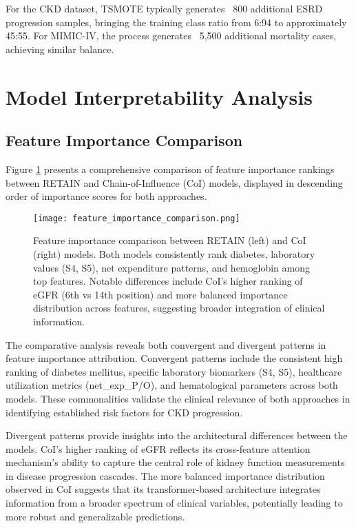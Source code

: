 \documentclass[letterpaper]{article}
\begin{document}
For the CKD dataset, TSMOTE typically generates ~800 additional ESRD progression samples, bringing the training class ratio from 6:94 to approximately 45:55. For MIMIC-IV, the process generates ~5,500 additional mortality cases, achieving similar balance.

\section{Model Interpretability Analysis}

\subsection{Feature Importance Comparison}

Figure \ref{fig:feature_comparison} presents a comprehensive comparison of feature importance rankings between RETAIN and Chain-of-Influence (CoI) models, displayed in descending order of importance scores for both approaches.

\begin{figure}[htbp]
\centering
\texttt{[image: feature\_importance\_comparison.png]}
\caption{Feature importance comparison between RETAIN (left) and CoI (right) models. Both models consistently rank diabetes, laboratory values (S4, S5), net expenditure patterns, and hemoglobin among top features. Notable differences include CoI's higher ranking of eGFR (6th vs 14th position) and more balanced importance distribution across features, suggesting broader integration of clinical information.}
\label{fig:feature_comparison}
\end{figure}

The comparative analysis reveals both convergent and divergent patterns in feature importance attribution. Convergent patterns include the consistent high ranking of diabetes mellitus, specific laboratory biomarkers (S4, S5), healthcare utilization metrics (net\_exp\_P/O), and hematological parameters across both models. These commonalities validate the clinical relevance of both approaches in identifying established risk factors for CKD progression.

Divergent patterns provide insights into the architectural differences between the models. CoI's higher ranking of eGFR reflects its cross-feature attention mechanism's ability to capture the central role of kidney function measurements in disease progression cascades. The more balanced importance distribution observed in CoI suggests that its transformer-based architecture integrates information from a broader spectrum of clinical variables, potentially leading to more robust and generalizable predictions.
\end{document}
